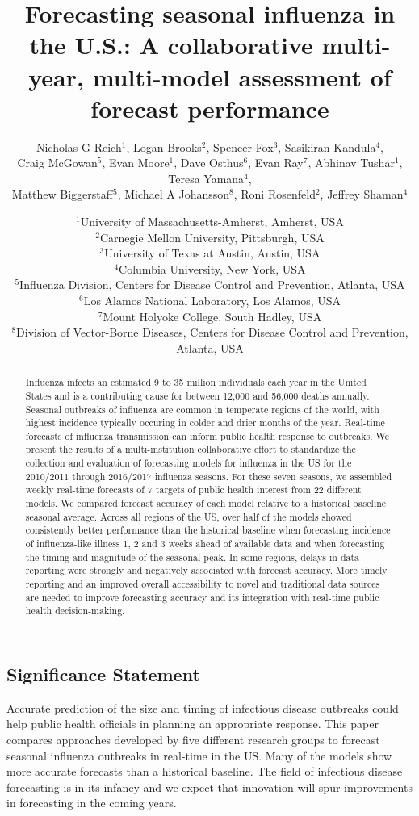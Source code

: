 \documentclass{article}\usepackage[]{graphicx}\usepackage[]{color}
\title{Forecasting seasonal influenza in the U.S.: A collaborative multi-year, multi-model assessment of forecast performance}
\author{Nicholas G Reich$^1$, Logan Brooks$^2$, Spencer Fox$^3$, Sasikiran Kandula$^4$, \\Craig McGowan$^5$, Evan Moore$^1$, Dave Osthus$^6$, Evan Ray$^7$, Abhinav Tushar$^1$, Teresa Yamana$^4$, \\Matthew Biggerstaff$^5$, Michael A Johansson$^8$, Roni Rosenfeld$^2$, Jeffrey Shaman$^4$}
\date{%
    $^1$University of Massachusetts-Amherst, Amherst, USA\\%
    $^2$Carnegie Mellon University, Pittsburgh, USA\\%
    $^3$University of Texas at Austin, Austin, USA\\
    $^4$Columbia University, New York, USA\\
    $^5$Influenza Division, Centers for Disease Control and Prevention, Atlanta, USA\\
    $^6$Los Alamos National Laboratory, Los Alamos, USA\\
    $^7$Mount Holyoke College, South Hadley, USA\\
    $^8$Division of Vector-Borne Diseases, Centers for Disease Control and Prevention, Atlanta, USA\\
}
\begin{document}
\maketitle

\begin{abstract}

Influenza infects an estimated 9 to 35 million individuals each year in the United States and is a contributing cause for between 12,000 and 56,000 deaths annually.
Seasonal outbreaks of influenza are common in temperate regions of the world, with highest incidence typically occuring in colder and drier months of the year. 
Real-time forecasts of influenza transmission can inform public health response to outbreaks. 
We present the results of a multi-institution collaborative effort to standardize the collection and evaluation of forecasting models for influenza in the US for the 2010/2011 through 2016/2017 influenza seasons. 
For these seven seasons, we assembled weekly real-time forecasts of 7 targets of public health interest from 22 different models.
We compared forecast accuracy of each model relative to a historical baseline seasonal average.
Across all regions of the US, over half of the models showed consistently better performance than the historical baseline when forecasting incidence of influenza-like illness 1, 2 and 3 weeks ahead of available data and when forecasting the timing and magnitude of the seasonal peak.
In some regions, delays in data reporting were strongly and negatively associated with forecast accuracy.
More timely reporting and an improved overall accessibility to novel and traditional data sources are needed to improve forecasting accuracy and its integration with real-time public health decision-making.

\end{abstract}

\subsection*{Significance Statement}
Accurate prediction of the size and timing of infectious disease outbreaks could help public health officials in planning an appropriate response. This paper compares approaches developed by five different research groups to forecast seasonal influenza outbreaks in real-time in the US. Many of the models show more accurate forecasts than a historical baseline. The field of infectious disease forecasting is in its infancy and we expect that innovation will spur improvements in forecasting in the coming years.
\end{document}
